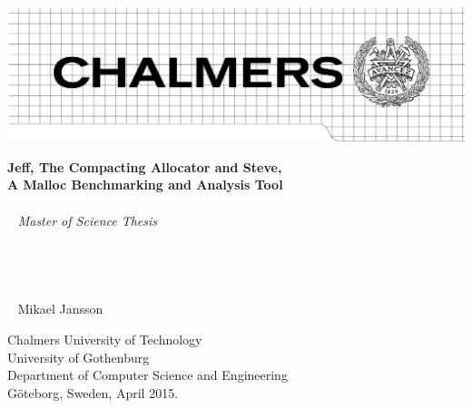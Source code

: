 \begin{titlepage}
\thispagestyle{empty}
\vspace*{-1.88in}
\hspace*{-1.63in}
\includegraphics[width=600pt]{graphics/chalmers/Chalmers} %

\vspace{3in}

\noindent
{\Large \bf Jeff, The Compacting Allocator and Steve, \\
A Malloc Benchmarking and Analysis Tool} \\
\\ ~
{\Large \it Master of Science Thesis} \\
\\ ~
\\ ~
\\ ~
\\ ~
{\Large Mikael Jansson}

\vfill
\noindent
Chalmers University of Technology \\
University of Gothenburg \\
Department of Computer Science and Engineering \\
Göteborg, Sweden, April 2015.

\end{titlepage}

\newpage{}
\thispagestyle{empty}
\mbox{}

